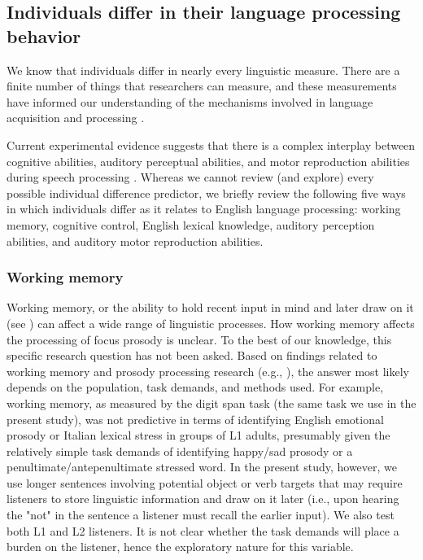 \subsection{Individuals differ in their language processing behavior}
We know that individuals differ in nearly every linguistic measure. There are a finite number of things that researchers can measure, and these measurements have informed our understanding of the mechanisms involved in language acquisition and processing \cite{Kidd2018, skehan1991individual, nelson1981individual}. 

Current experimental evidence suggests that there is a complex interplay between cognitive abilities, auditory perceptual abilities, and motor reproduction abilities during speech processing \citep{saito2022does, bramlett_wiener_24_speechprosody, bakkouche2025effects, Kachlicka_Saito_Tierney_2019}. Whereas we cannot review (and explore) every possible individual difference predictor, we briefly review the following five ways in which individuals differ as it relates to English language processing: working memory, cognitive control, English lexical knowledge, auditory perception abilities, and auditory motor reproduction abilities.


\subsubsection{Working memory}
Working memory, or the ability to hold recent input in mind and later draw on it (see \cite{baddeley2003working,carpenter2013role}) can affect a wide range of linguistic processes. How working memory affects the processing of focus prosody is unclear. To the best of our knowledge, this specific research question has not been asked. Based on findings related to working memory and prosody processing research (e.g., \cite{traxler2009hierarchical,ferreira2015prosody, bishop2021exploring}), the answer most likely depends on the population, task demands, and methods used. For example, working memory, as measured by the digit span task (the same task we use in the present study), was not predictive in terms of identifying English emotional prosody \citep{sinagra2022perception} or Italian lexical stress \citep{ppcc} in groups of L1 adults, presumably given the relatively simple task demands of identifying happy/sad prosody or a penultimate/antepenultimate stressed word. In the present study, however, we use longer sentences involving potential object or verb targets that may require listeners to store linguistic information and draw on it later (i.e., upon hearing the "not" in the sentence a listener must recall the earlier input). We also test both L1 and L2 listeners. It is not clear whether the task demands will place a burden on the listener, hence the exploratory nature for this variable. 


